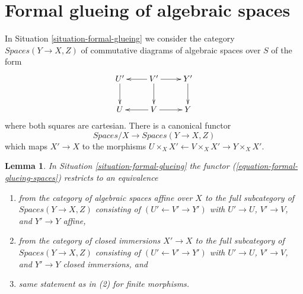 \documentclass{stacks-project}
\theoremstyle{plain}
\newtheorem{lemma}[subsection]{Lemma}
\theoremstyle{definition}
\theoremstyle{remark}
\numberwithin{equation}{subsection}
\begin{document}
\section{Formal glueing of algebraic spaces}
\label{section-formal-glueing-spaces}

\noindent
In Situation \ref{situation-formal-glueing} we consider the category
$\textit{Spaces}(Y \to X, Z)$
of commutative diagrams of algebraic spaces over $S$ of the form
$$
\xymatrix{
U' \ar[d] & V' \ar[l] \ar[d] \ar[r] & Y' \ar[d] \\
U & V \ar[l] \ar[r] & Y
}
$$
where both squares are cartesian. There is a canonical functor
\begin{equation}
\label{equation-formal-glueing-spaces}
\textit{Spaces}/X \longrightarrow \textit{Spaces}(Y \to X, Z)
\end{equation}
which maps $X' \to X$ to the morphisms
$U \times_X X' \leftarrow V \times_X X' \rightarrow Y \times_X X'$.

\begin{lemma}
\label{lemma-equivalence-on-affine}
In Situation \ref{situation-formal-glueing} the functor
(\ref{equation-formal-glueing-spaces}) restricts to an
equivalence
\begin{enumerate}
\item from the category of algebraic spaces affine over $X$
to the full subcategory of $\textit{Spaces}(Y \to X, Z)$ consisting
of $(U' \leftarrow V' \rightarrow Y')$ with $U' \to U$, $V' \to V$,
and $Y' \to Y$ affine,
\item from the category of closed immersions $X' \to X$
to the full subcategory of $\textit{Spaces}(Y \to X, Z)$ consisting
of $(U' \leftarrow V' \rightarrow Y')$ with $U' \to U$, $V' \to V$,
and $Y' \to Y$ closed immersions, and
\item same statement as in (2) for finite morphisms.
\end{enumerate}
\end{lemma}
\end{document}
